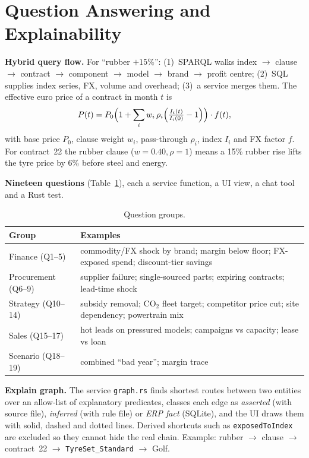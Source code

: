\documentclass[conference]{IEEEtran}
\begin{document}
\section{Question Answering and Explainability}
\textbf{Hybrid query flow.} For ``rubber $+15\%$'': (1)~SPARQL walks index $\rightarrow$ clause $\rightarrow$ contract $\rightarrow$ component $\rightarrow$ model $\rightarrow$ brand $\rightarrow$ profit centre; (2)~SQL supplies index series, FX, volume and overhead; (3)~a service merges them. The effective euro price of a contract in month $t$ is
\begin{equation}
P(t)=P_0\Bigl(1+\sum_i w_i\,\rho_i\Bigl(\tfrac{I_i(t)}{I_i(0)}-1\Bigr)\Bigr)\cdot f(t),
\end{equation}
with base price $P_0$, clause weight $w_i$, pass-through $\rho_i$, index $I_i$ and FX factor $f$. For contract~22 the rubber clause ($w=0.40,\rho=1$) means a 15\% rubber rise lifts the tyre price by 6\% before steel and energy.

\textbf{Nineteen questions} (Table~\ref{tab:q}), each a service function, a UI view, a chat tool and a Rust test.

\begin{table}[t]
\centering\caption{Question groups.}\label{tab:q}
\footnotesize
\begin{tabularx}{\columnwidth}{@{}lX@{}}
\toprule
Group & Examples\\
\midrule
Finance (Q1--5) & commodity/FX shock by brand; margin below floor; FX-exposed spend; discount-tier savings\\
Procurement (Q6--9) & supplier failure; single-sourced parts; expiring contracts; lead-time shock\\
Strategy (Q10--14) & subsidy removal; CO$_2$ fleet target; competitor price cut; site dependency; powertrain mix\\
Sales (Q15--17) & hot leads on pressured models; campaigns vs capacity; lease vs loan\\
Scenario (Q18--19) & combined ``bad year''; margin trace\\
\bottomrule
\end{tabularx}
\end{table}

\textbf{Explain graph.} The service \texttt{graph.rs} finds shortest routes between two entities over an allow-list of explanatory predicates, classes each edge as \emph{asserted} (with source file), \emph{inferred} (with rule file) or \emph{ERP fact} (SQLite), and the UI draws them with solid, dashed and dotted lines. Derived shortcuts such as \texttt{exposedToIndex} are excluded so they cannot hide the real chain. Example: rubber $\rightarrow$ clause $\rightarrow$ contract~22 $\rightarrow$ \texttt{TyreSet\_Standard} $\rightarrow$ Golf.
\end{document}
